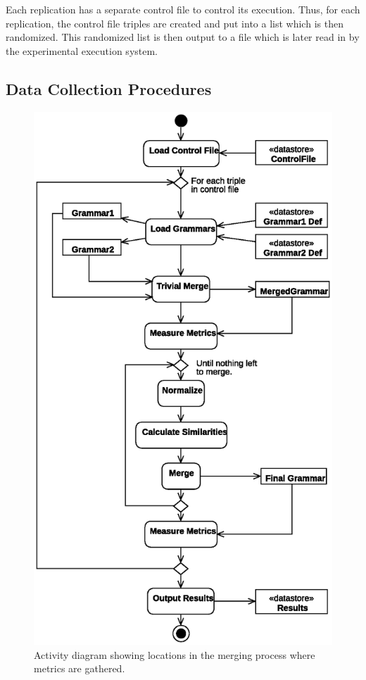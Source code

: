 \documentclass[conference]{IEEEtran}
\begin{document}
\noindent Each replication has a separate control file to control its
execution. Thus, for each replication, the control file triples are
created and put into a list which is then randomized. This randomized
list is then output to a file which is later read in by the experimental
execution system.

\hypertarget{sec:data_coll_proc}{%
\subsection{Data Collection Procedures}\label{sec:data_coll_proc}}

\begin{figure}
\hypertarget{fig:dc_proc}{%
\centering
\includegraphics{images/paper/data_collect.eps}
\caption{Activity diagram showing locations in the merging process where
metrics are gathered.}\label{fig:dc_proc}
}
\end{figure}
\end{document}
